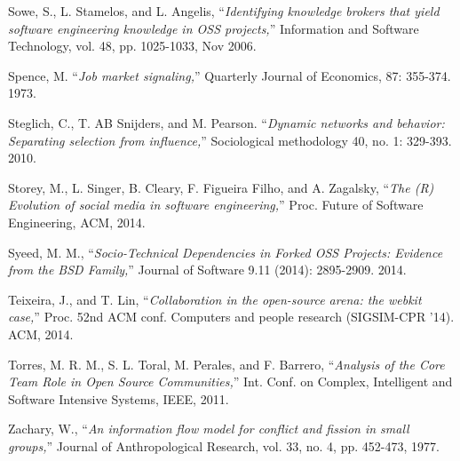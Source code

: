 \begin{thebibliography}{99.}
 Sowe, S., L. Stamelos, and L. Angelis, ``\textit{Identifying knowledge brokers that yield software engineering knowledge in OSS projects,}'' Information and Software Technology, vol. 48, pp. 1025-1033, Nov 2006. 

 Spence, M. ``\textit{Job market signaling,}'' Quarterly Journal of Economics, 87: 355-374. 1973.

 Steglich, C., T. AB Snijders, and M. Pearson. ``\textit{Dynamic networks and behavior: Separating selection from influence,}'' Sociological methodology 40, no. 1: 329-393. 2010.

 Storey, M., L. Singer, B. Cleary, F. Figueira Filho, and A. Zagalsky, ``\textit{The (R) Evolution of social media in software engineering,}'' Proc. Future of Software Engineering, ACM, 2014.

 Syeed, M. M., ``\textit{Socio-Technical Dependencies in Forked OSS Projects: Evidence from the BSD Family,}'' Journal of Software 9.11 (2014): 2895-2909. 2014.

 Teixeira, J., and T. Lin, ``\textit{Collaboration in the open-source arena: the webkit case,}'' Proc. 52nd ACM conf. Computers and people research (SIGSIM-CPR '14). ACM, 2014.

 Torres, M. R. M., S. L. Toral, M. Perales, and F. Barrero, ``\textit{Analysis of the Core Team Role in Open Source Communities,}'' Int. Conf. on Complex, Intelligent and Software Intensive Systems, IEEE, 2011. 

 Zachary, W., ``\textit{An information flow model for conflict and fission in small groups,}'' Journal of Anthropological Research, vol. 33, no. 4, pp. 452-473, 1977.

\end{thebibliography}
